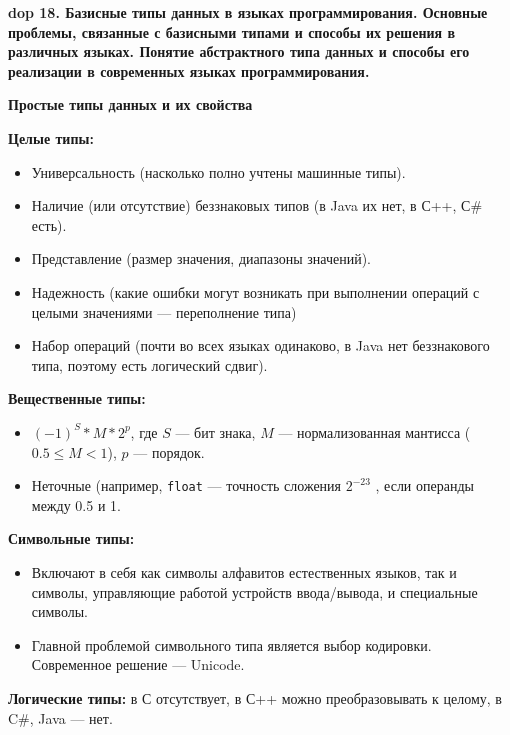 \textbf{\LARGE dop 18. Базисные типы данных в языках программирования. Основные проблемы, связанные с базисными типами и способы их решения в различных языках. Понятие абстрактного типа данных и способы его реализации в современных языках программирования.}

\textbf{Простые типы данных и их свойства}

\textbf{Целые типы:}
\begin{itemize}
    \item Универсальность (насколько полно учтены машинные типы).
    \item Наличие (или отсутствие) беззнаковых типов (в Java их нет, в С++, С\# есть).
    \item Представление (размер значения, диапазоны значений).
    \item Надежность (какие ошибки могут возникать при выполнении операций с целыми значениями --- переполнение типа)
    \item Набор операций (почти во всех языках одинаково, в Java нет беззнакового типа, поэтому есть логический сдвиг).
\end{itemize}

\textbf{Вещественные типы:}
\begin{itemize}
    \item $(-1)^S \ast M \ast 2^p$, где $S$ --- бит знака, $M$ --- нормализованная мантисса ($0.5 \leq M < 1$), $p$ --- порядок.
    \item Неточные (например, \texttt{float} --- точность сложения $2^{-23}$ , если операнды между 0.5 и 1.
\end{itemize}

\textbf{Символьные типы:}
\begin{itemize}
    \item Включают в себя как символы алфавитов естественных языков, так и символы, управляющие работой устройств ввода/вывода, и специальные символы.
    \item Главной проблемой символьного типа является выбор кодировки.
    Современное решение --- Unicode.
\end{itemize}

\textbf{Логические типы:} в С отсутствует, в С++ можно преобразовывать к целому, в C\#, Java --- нет.

